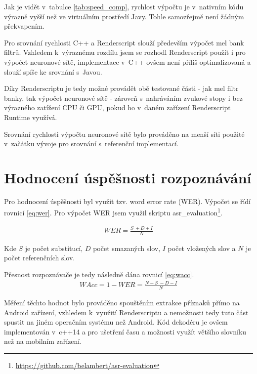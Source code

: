 Jak je vidět v~tabulce \ref{tab:speed_comp}, rychlost výpočtu je v~nativním kódu výrazně vyšší než ve virtuálním prostředí Javy. Tohle samozřejmě není žádným překvapením. 

Pro srovnání rychlosti C++ a Renderscript slouží především výpočet mel bank filtrů. Vzhledem k~výraznému rozdílu jsem se rozhodl Renderscript použít i pro výpočet neuronové sítě, implementace v~C++ ovšem není příliš optimalizovaná a slouží spíše ke srovnání s~Javou.

Díky Renderscriptu je tedy možné provádět obě testované části - jak mel filtr banky, tak výpočet neuronové sítě - zároveň s~nahráváním zvukové stopy i bez výrazného zatížení CPU či GPU, pokud ho v~daném zařízení Renderscript Runtime využívá.

Srovnání rychlosti výpočtu neuronové sítě bylo prováděno na menší síti použité v~začátku vývoje pro srovnání s~referenční implementací.

\section{Hodnocení úspěšnosti rozpoznávání}
Pro hodnocení úspěšnosti byl využit tzv. word error rate (WER). Výpočet se řídí rovnicí \ref{eq:wer}. Pro výpočet WER jsem využil skriptu asr\_evaluation\footnote{\url{https://github.com/belambert/asr-evaluation}}.

\begin{equation} \label{eq:wer}
\begin{gathered}
WER = \frac{S~+ D + I}{N}
\end{gathered}
\end{equation}

Kde $S$ je počet substitucí, $D$ počet smazaných slov, $I$ počet vložených slov a $N$ je počet referenčních slov.

Přesnost rozpoznávače je tedy následně dána rovnicí \ref{eq:wacc}.
\begin{equation} \label{eq:wacc}
\begin{gathered}
WAcc = 1 - WER = \frac{N - S~- D - I}{N}
\end{gathered}
\end{equation}

Měření těchto hodnot bylo prováděno spouštěním extrakce příznaků přímo na Android zařízení, vzhledem k~využití Renderscriptu a nemožnosti tedy tuto část spustit na jiném operačním systému než Android. Kód dekodéru je ovšem implementován v~c++14 a pro ušetření času a možnosti využít většího slovníku než na mobilním zařízení. 

